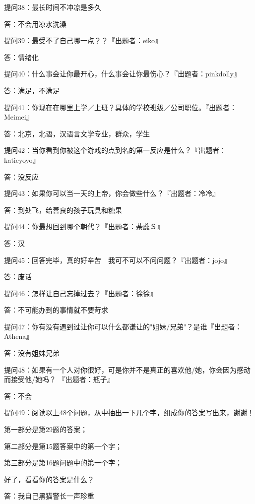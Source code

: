 		\vspace{1em}
		提问38：最长时间不冲凉是多久\par
		答：不会用凉水洗澡

		\vspace{1em}
		提问39：最受不了自己哪一点？？『出题者：eiko』\par
		答：情绪化

		\vspace{1em}
		提问40：什么事会让你最开心，什么事会让你最伤心？『出题者：pinkdolly』\par
		答：满足，不满足

		\vspace{1em}
		提问41：你现在在哪里上学／上班？具体的学校班级／公司职位。『出题者：Meimei』\par
		答：北京，北语，汉语言文学专业，群众，学生

		\vspace{1em}
		提问42：当你看到你被这个游戏的点到名的第一反应是什么？『出题者：katieyoyo』\par
		答：没反应

		\vspace{1em}
		提问43：如果你可以当一天的上帝，你会做些什么？『出题者：冷冷』\par
		答：到处飞，给善良的孩子玩具和糖果

		\vspace{1em}
		提问44：你最想回到哪个朝代？『出题者：荼蘼Ｓ』\par
		答：汉

		\vspace{1em}
		提问45：回答完毕，真的好辛苦　我可不可以不问问题？『出题者：jojo』\par
		答：废话

		\vspace{1em}
		提问46：怎样让自己忘掉过去？『出题者：徐徐』\par
		答：不可能办到的事情就不要苛求

		\vspace{1em}
		提问47：你有没有遇到过让你可以什么都谦让的"姐妹/兄弟"？是谁『出题者：Athena』\par
		答：没有姐妹兄弟

		\vspace{1em}
		提问48：如果有一个人对你很好，可是你并不是真正的喜欢他/她，你会因为感动而接受他/她吗？
				『出题者：瓶子』\par
		答：不会

		提问49：阅读以上48个问题，从中抽出一下几个字，组成你的答案写出来，谢谢！\par
		第一部分是第29题的答案；\par
		第二部分是第15题答案中的第一个字；\par
		第三部分是第16题问题中的第一个字；\par
		好了，看看你的答案是什么？\par
		答：我自己黑猫警长一声珍重

